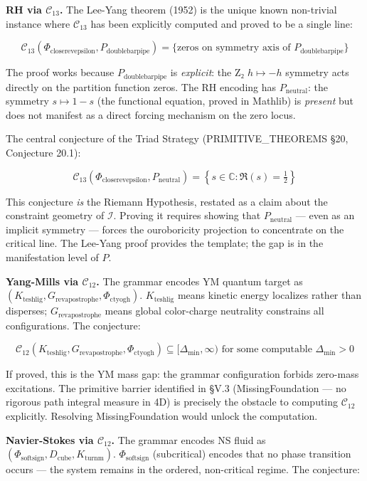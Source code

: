 \documentclass[12pt,a4paper]{article}
\newcommand{\pilcrow}{\S}
\begin{document}
\textbf{RH via $\mathcal{C}_{13}$.} The Lee-Yang theorem (1952) is the unique known non-trivial instance where $\mathcal{C}_{13}$ has been explicitly computed and proved to be a single line:

\[\mathcal{C}_{13}(\Phi_{\text{closerevepsilon}}, P_{\text{doublebarpipe}}) = \{ \text{zeros on symmetry axis of } P_{\text{doublebarpipe}} \}\]

The proof works because $P_{\text{doublebarpipe}}$ is \emph{explicit}: the Z₂ $h \mapsto -h$ symmetry acts directly on the partition function zeros. The RH encoding has $P_\text{neutral}$: the symmetry $s \mapsto 1-s$ (the functional equation, proved in Mathlib) is \emph{present} but does not manifest as a direct forcing mechanism on the zero locus.

The central conjecture of the Triad Strategy (PRIMITIVE\_THEOREMS \pilcrow{}20, Conjecture 20.1):

\[\mathcal{C}_{13}(\Phi_{\text{closerevepsilon}}, P_\text{neutral}) = \left\{ s \in \mathbb{C} : \Re(s) = \tfrac{1}{2} \right\}\]

This conjecture \emph{is} the Riemann Hypothesis, restated as a claim about the constraint geometry of $\mathcal{I}$. Proving it requires showing that $P_\text{neutral}$ --- even as an implicit symmetry --- forces the ouroboricity projection to concentrate on the critical line. The Lee-Yang proof provides the template; the gap is in the manifestation level of $P$.

\textbf{Yang-Mills via $\mathcal{C}_{12}$.} The grammar encodes YM quantum target as $(K_{\text{teshlig}}, G_{\text{revapostrophe}}, \Phi_{\text{ctyogh}})$. $K_{\text{teshlig}}$ means kinetic energy localizes rather than disperses; $G_{\text{revapostrophe}}$ means global color-charge neutrality constrains all configurations. The conjecture:

\[\mathcal{C}_{12}(K_{\text{teshlig}}, G_{\text{revapostrophe}}, \Phi_{\text{ctyogh}}) \subseteq [\Delta_\text{min}, \infty) \text{ for some computable } \Delta_\text{min} > 0\]

If proved, this is the YM mass gap: the grammar configuration forbids zero-mass excitations. The primitive barrier identified in \pilcrow{}V.3 (MissingFoundation --- no rigorous path integral measure in 4D) is precisely the obstacle to computing $\mathcal{C}_{12}$ explicitly. Resolving MissingFoundation would unlock the computation.

\textbf{Navier-Stokes via $\mathcal{C}_{12}$.} The grammar encodes NS fluid as $(\Phi_{\text{softsign}}, D_\text{cube}, K_{\text{turnm}})$. $\Phi_{\text{softsign}}$ (subcritical) encodes that no phase transition occurs --- the system remains in the ordered, non-critical regime. The conjecture:
\end{document}
